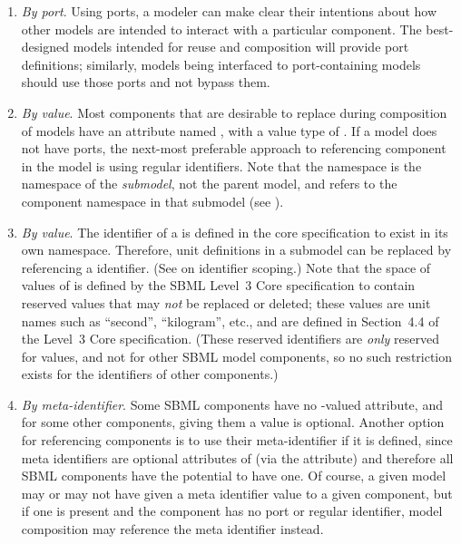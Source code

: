 \begin{enumerate}

\item \emph{By port}.  Using ports, a modeler can make clear their
  intentions about how other models are intended to interact with a
  particular component.  The best-designed models intended for reuse and
  composition will provide port definitions; similarly, models being
  interfaced to port-containing models should use those ports and not
  bypass them.

\item \emph{By \fixttspace{} value}.  Most components that
  are desirable to replace during composition of models have an
  attribute named , with a value type of .  If a
  model does not have ports, the next-most preferable approach to
  referencing component in the model is using regular identifiers.  Note
  that the  namespace is the namespace of the
  \emph{submodel}, not the parent model, and refers to the component
  namespace in that submodel (see ).

\item \emph{By \fixttspace{} value}.  The identifier of
  a \UnitDefinition is defined in the core specification to exist in its
  own namespace.  Therefore, unit definitions in a submodel can be
  replaced by referencing a \UnitDefinition identifier.  (See
   on identifier scoping.)  Note that the space of
  values of  is defined by the SBML Level~3 Core
  specification to contain reserved values that may \emph{not} be
  replaced or deleted; these values are unit names such as ``second'',
  ``kilogram'', etc., and are defined in Section~4.4 of the Level~3 Core
  specification.  (These reserved identifiers are \emph{only} reserved
  for \UnitDefinition values, and not for other SBML model components,
  so no such restriction exists for the identifiers of other
  components.)

\item \emph{By meta-identifier}.  Some SBML components have no
  -valued attribute, and for some other components, giving
  them a value is optional.  Another option for referencing components
  is to use their meta-identifier if it is defined, since meta
  identifiers are optional attributes of \SBase (via the 
  attribute) and therefore all SBML components have the potential to
  have one.  Of course, a given model may or may not have given a meta
  identifier value to a given component, but if one is present and the
  component has no port or regular identifier, model composition may
  reference the meta identifier instead.


\end{enumerate}
